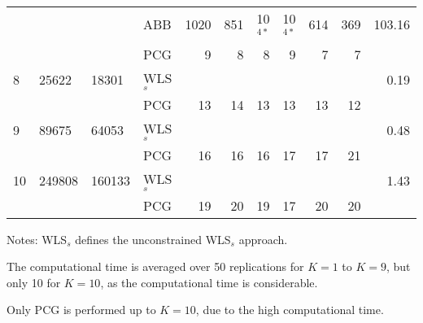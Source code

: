 \documentclass[11pt]{article}
\newcommand{\0}{\phantom{0}}
\begin{document}
\begin{table}[ht]
\begin{threeparttable}
\begin{tabular}{llllrrrrrrr}
			& & & ABB & 1020 & 851 & 10$^{4*}$ & 10$^{4*}$ & 614 & 369 & 103.16 \\
			& & & PCG & 9 & 8 & 8 & 9 & 7 & 7 & \pmb{$2.09$} \\
			\midrule
			8 & 25622 & 18301 & WLS$_{s}$ & & & & & & & 0.19 \\
			& & & PCG & 13 & 14 & 13 & 13 & 13 & 12 & \pmb{$19.08$} \\
			\midrule
			9 & 89675 & 64053 & WLS$_{s}$ & & & & & & & 0.48 \\
			& & & PCG & 16 & 16 & 16 & 17 & 17 & 21 & \pmb{$244.68$} \\
			\midrule		
			10 & 249808 & 160133 & WLS$_{s}$ & & & & & & & 1.43 \\
			& & & PCG & 19 & 20 & 19 & 17 & 20 & 20 & \pmb{$1660.12$} \\
			\bottomrule
		\end{tabular}
		\begin{tablenotes}
			\item [] Notes: WLS$_{s}$ defines the unconstrained WLS$_{s}$ approach. 
			\item [] The computational time is averaged over 50 replications for $K = 1$ to $K = 9$, but only 10 for $K = 10$, as the computational time is considerable.
			\item [] Only PCG is performed up to $K = 10$, due to the high computational time.	
		\end{tablenotes}
	\end{threeparttable}
\end{table}
\end{document}
